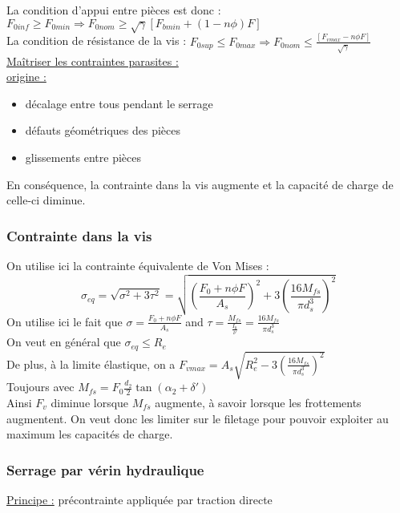 \documentclass[../main.tex]{subfiles}
\begin{document}
La condition d'appui entre pièces est donc : $F_{0inf} \geq F_{0min} \Rightarrow F_{0nom} \geq \sqrt{\gamma}[F_{bmin} +(1-n\phi)F]$\\
La condition de résistance de la vis : $F_{0sup}\leq F_{0max} \Rightarrow F_{0nom} \leq \frac{[F_{vmax}-n\phi F]}{\sqrt{\gamma}}$\\

\quad \underline{Maîtriser les contraintes parasites :}\\
\underline{origine :} \begin{itemize}
    \item décalage entre tous pendant le serrage\\
    \item défauts géométriques des pièces\\
    \item glissements entre pièces\\
\end{itemize}
En conséquence, la contrainte dans la vis augmente et la capacité de charge de celle-ci diminue.\\
\subsubsection{Contrainte dans la vis}
On utilise ici la contrainte équivalente de Von Mises :\\
\begin{equation}
    \sigma_{eq} = \sqrt{\sigma^2 + 3\tau^2} = \sqrt{(\frac{F_0 + n\phi F}{A_s})^2 + 3(\frac{16 M_{fs}}{\pi d_s^3})^2}
\end{equation}
On utilise ici le fait que $\sigma = \frac{F_0 + n\phi F}{A_s}$ and $\tau = \frac{M_{fs}}{\frac{I_0}{\nu}} = \frac{16 M_{fs}}{\pi d_s^3}$\\

On veut en général que $\sigma_{eq} \leq R_e$\\
De plus, à la limite élastique, on a $F_{vmax} = A_s \sqrt{R_e^2 - 3(\frac{16M_{fs}}{\pi d_s^3})^2}$\\
Toujours avec $M_{fs} = F_0 \frac{d_2}{2} \tan(\alpha_2 + \delta')$\\

Ainsi $F_v$ diminue lorsque $M_{fs}$ augmente, à savoir lorsque les frottements augmentent. On veut donc les limiter sur le filetage pour pouvoir exploiter au maximum les capacités de charge.\\

\subsubsection{Serrage par vérin hydraulique}
\quad \underline{Principe :} précontrainte appliquée par traction directe\\
\end{document}
